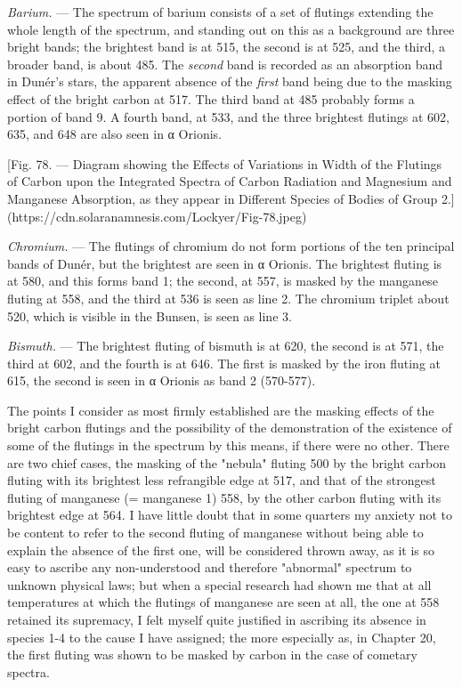 \documentclass[a4paper, 12pt, oneside, polutonikogreek, english]{article}
\begin{document}
\emph{Barium.} --- The spectrum of barium consists of a set of flutings extending the whole length of the spectrum, and standing out on this as a background are three bright bands; the brightest band is at 515, the second is at 525, and the third, a broader band, is about 485. The \emph{second} band is recorded as an absorption band in Dunér's stars, the apparent absence of the \emph{first} band being due to the masking effect of the bright carbon at 517. The third band at 485 probably forms a portion of band 9. A fourth band, at 533, and the three brightest flutings at 602, 635, and 648 are also seen in α Orionis.

[Fig. 78. --- Diagram showing the Effects of Variations in Width of the Flutings of Carbon upon the Integrated Spectra of Carbon Radiation and Magnesium and Manganese Absorption, as they appear in Different Species of Bodies of Group 2.](https://cdn.solaranamnesis.com/Lockyer/Fig-78.jpeg)

\emph{Chromium.} --- The flutings of chromium do not form portions of the ten principal bands of Dunér, but the brightest are seen in α Orionis. The brightest fluting is at 580, and this forms band 1; the second, at 557, is masked by the manganese fluting at 558, and the third at 536 is seen as line 2. The chromium triplet about 520, which is visible in the Bunsen, is seen as line 3.

\emph{Bismuth.} --- The brightest fluting of bismuth is at 620, the second is at 571, the third at 602, and the fourth is at 646. The first is masked by the iron fluting at 615, the second is seen in α Orionis as band 2 (570-577).

The points I consider as most firmly established are the masking effects of the bright carbon flutings and the possibility of the demonstration of the existence of some of the flutings in the spectrum by this means, if there were no other. There are two chief cases, the masking of the "nebula" fluting 500 by the bright carbon fluting with its brightest less refrangible edge at 517, and that of the strongest fluting of manganese (= manganese 1) 558, by the other carbon fluting with its brightest edge at 564. I have little doubt that in some quarters my anxiety not to be content to refer to the second fluting of manganese without being able to explain the absence of the first one, will be considered thrown away, as it is so easy to ascribe any non-understood and therefore "abnormal" spectrum to unknown physical laws; but when a special research had shown me that at all temperatures at which the flutings of manganese are seen at all, the one at 558 retained its supremacy, I felt myself quite justified in ascribing its absence in species 1-4 to the cause I have assigned; the more especially as, in Chapter 20, the first fluting was shown to be masked by carbon in the case of cometary spectra.
\end{document}

